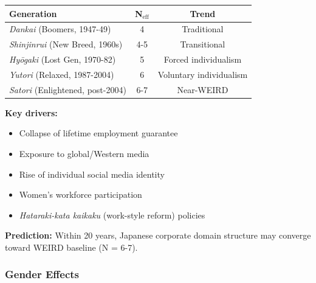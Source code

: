 \begin{tcolorbox}[colback=green!5!white, colframe=green!75!black, title=Finding: Generational Shift Toward WEIRD Domain Structure]

\begin{center}
\begin{tabular}{@{}lcc@{}}
\toprule
\textbf{Generation} & \textbf{N$_{\text{eff}}$} & \textbf{Trend} \\
\midrule
\textit{Dankai} (Boomers, 1947-49) & 4 & Traditional \\
\textit{Shinjinrui} (New Breed, 1960s) & 4-5 & Transitional \\
\textit{Hyōgaki} (Lost Gen, 1970-82) & 5 & Forced individualism \\
\textit{Yutori} (Relaxed, 1987-2004) & 6 & Voluntary individualism \\
\textit{Satori} (Enlightened, post-2004) & 6-7 & Near-WEIRD \\
\bottomrule
\end{tabular}
\end{center}

\textbf{Key drivers:}
\begin{itemize}[nosep]
\item Collapse of lifetime employment guarantee
\item Exposure to global/Western media
\item Rise of individual social media identity
\item Women's workforce participation
\item \textit{Hataraki-kata kaikaku} (work-style reform) policies
\end{itemize}

\textbf{Prediction:} Within 20 years, Japanese corporate domain structure may converge toward WEIRD baseline (N = 6-7).

\end{tcolorbox}

\subsubsection{Gender Effects}

